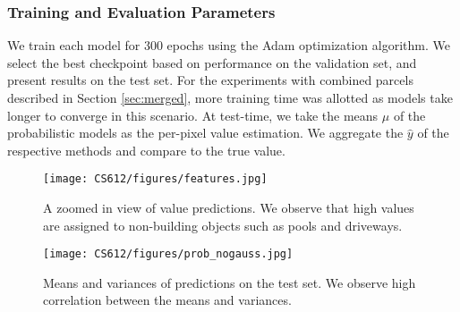 \documentclass[10pt,twocolumn,letterpaper]{article}
\begin{document}
    
\subsubsection{Training and Evaluation Parameters}

    We train each model for 300 epochs using the  Adam optimization algorithm. We select the best checkpoint based on performance on the validation set, and present results on the test set. For the experiments with combined parcels described in Section \ref{sec:merged}, more training time was allotted as models take longer to converge in this scenario. At test-time, we take the means $\mu$ of the probabilistic models as the per-pixel value estimation. We aggregate the $\hat{y}$ of the respective methods and compare to the true value.   



\begin{figure}[t]
        \centering
        \texttt{[image: CS612/figures/features.jpg]}
        \caption{A zoomed in view of value predictions. We observe that high values are assigned to non-building objects such as pools and driveways.}
        \label{fig:pool_image}
    \end{figure}

\begin{figure*}[ht]
        \centering
        \texttt{[image: CS612/figures/prob\_nogauss.jpg]}
        \caption{Means and variances of predictions on the test set. We observe high correlation between the means and variances.}
        \label{fig:qualitative_uncertainty}
    \end{figure*}
    
\end{document}
